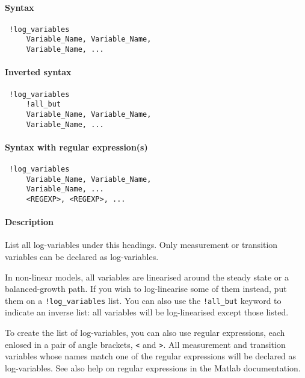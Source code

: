 


	\paragraph{Syntax}
 
 \begin{verbatim}
 !log_variables
     Variable_Name, Variable_Name, 
     Variable_Name, ...
 \end{verbatim}
 
 \paragraph{Inverted syntax}
 
 \begin{verbatim}
 !log_variables
     !all_but
     Variable_Name, Variable_Name, 
     Variable_Name, ...
 \end{verbatim}
 
 \paragraph{Syntax with regular expression(s)}
 
 \begin{verbatim}
 !log_variables
     Variable_Name, Variable_Name, 
     Variable_Name, ...
     <REGEXP>, <REGEXP>, ...
 \end{verbatim}
 
 \paragraph{Description}
 
 List all log-variables under this headings. Only measurement or
 transition variables can be declared as log-variables.
 
 In non-linear models, all variables are linearised around the steady
 state or a balanced-growth path. If you wish to log-linearise some of
 them instead, put them on a \texttt{!log\_variables} list. You can also
 use the \texttt{!all\_but} keyword to indicate an inverse list: all
 variables will be log-linearised except those listed.
 
 To create the list of log-variables, you can also use regular
 expressions, each enlosed in a pair of angle brackets,
 \texttt{\textless{}} and \texttt{\textgreater{}}. All measurement and
 transition variables whose names match one of the regular expressions
 will be declared as log-variables. See also help on regular expressions
 in the Matlab documentation.
 
